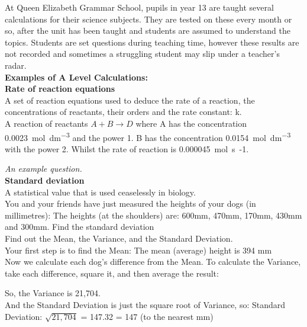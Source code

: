 \documentclass[a4paper,12pt]{report}
\begin{document}
\begin{flushleft}
At Queen Elizabeth Grammar School, pupils in year 13 are taught several calculations for their science subjects. They are tested on these every month or so, after the unit has been taught and students are assumed to understand the topics. Students are set questions during teaching time, however these results are not recorded and sometimes a struggling student may slip under a teacher’s radar.
\\\textbf{Examples of A Level Calculations:}\\
\bigskip
\textbf{Rate of reaction equations}\\

A set of reaction equations used to deduce the rate of a reaction, the concentrations of reactants, their orders and the rate constant: k. \\
A reaction of reactants $A + B \rightarrow D $ where A has the concentration \SI{0.0023}{mol.dm^{-3}} and the power 1. B has the concentration \SI{0.0154}{mol.dm^{-3}}
with the power 2. Whilst the rate of reaction is \SI{0.000045}{mol.s{-1}}.

\emph{An example question.}	\\
\bigskip
\textbf{Standard deviation}\\
 A statistical value that is used ceaselessly in biology.\\
         You and your friends have just measured the heights of your dogs (in millimetres):
         The heights (at the shoulders) are: 600mm, 470mm, 170mm, 430mm and 300mm.
	Find the standard deviation\\
Find out the Mean, the Variance, and the Standard Deviation.\\
Your first step is to find the Mean:
The mean (average) height is 394 mm\\
Now we calculate each dog's difference from the Mean. To calculate the Variance, take each difference, square it, and then average the result:

So, the Variance is 21,704.\\
And the Standard Deviation is just the square root of Variance, so:
Standard Deviation: $\sqrt{21,704}$ = 147.32  = 147 (to the nearest mm)\\



\end{flushleft}
\end{document}
